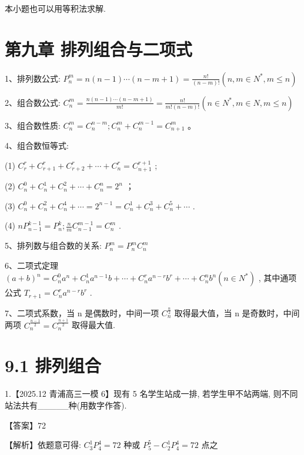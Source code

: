 \documentclass[10pt]{article}
\begin{document}
本小题也可以用等积法求解.

\section*{第九章 排列组合与二项式}

1、排列数公式: \({P}_{n}^{m} = n\left( {n - 1}\right) \cdots \left( {n - m + 1}\right)  = \frac{n!}{\left( {n - m}\right) !}\left( {n,m \in  {N}^{ * },m \leq  n}\right)\)

2、组合数公式: \({C}_{n}^{m} = \frac{n\left( {n - 1}\right) \cdots \left( {n - m + 1}\right) }{m!} = \frac{n!}{m!\left( {n - m}\right) !}\left( {n \in  {N}^{ * },m \in  N,m \leq  n}\right)\)

3、组合数性质: \({C}_{n}^{m} = {C}_{n}^{n - m};{C}_{n}^{m} + {C}_{n}^{m - 1} = {C}_{n + 1}^{m}\) 。

4、组合数恒等式:

(1) \({C}_{r}^{r} + {C}_{r + 1}^{r} + {C}_{r + 2}^{r} + \cdots  + {C}_{n}^{r} = {C}_{n + 1}^{r + 1}\) ;

(2) \({C}_{n}^{0} + {C}_{n}^{1} + {C}_{n}^{2} + \cdots  + {C}_{n}^{n} = {2}^{n}\) ；

(3) \({C}_{n}^{0} + {C}_{n}^{2} + {C}_{n}^{4} + \cdots  = {2}^{n - 1} = {C}_{n}^{1} + {C}_{n}^{3} + {C}_{n}^{5} + \cdots\) .

(4) \(n{P}_{n - 1}^{k - 1} = {P}_{n}^{k};\frac{n}{m}{C}_{n - 1}^{m - 1} = {C}_{n}^{m}\) .

5、排列数与组合数的关系: \({P}_{n}^{m} = {P}_{n}^{m}{C}_{n}^{m}\)

6、二项式定理 \({\left( a + b\right) }^{n} = {C}_{n}^{0}{a}^{n} + {C}_{n}^{1}{a}^{n - 1}b + \cdots  + {C}_{n}^{r}{a}^{n - r}{b}^{r} + \cdots  + {C}_{n}^{n}{b}^{n}\left( {n \in  {N}^{ * }}\right)\) , 其中通项公式 \({T}_{r + 1} = {C}_{n}^{r}{a}^{n - r}{b}^{r}\) .

7、二项式系数，当 \(\mathrm{n}\) 是偶数时，中间一项 \({C}_{n}^{\frac{n}{2}}\) 取得最大值，当 \(\mathrm{n}\) 是奇数时，中间两项 \({C}_{n}^{\frac{n - 1}{2}} = {C}_{n}^{\frac{n + 1}{2}}\) 取得最大值.

\section*{9.1 排列组合}

1.【2025.12 青浦高三一模 6】现有 5 名学生站成一排, 若学生甲不站两端, 则不同站法共有\_\_\_\_\_种(用数字作答).

【答案】72

【解析】依题意可得: \({C}_{3}^{1}{P}_{4}^{4} = {72}\) 种或 \({P}_{5}^{5} - {C}_{2}^{1}{P}_{4}^{4} = {72}\) 点之
\end{document}
